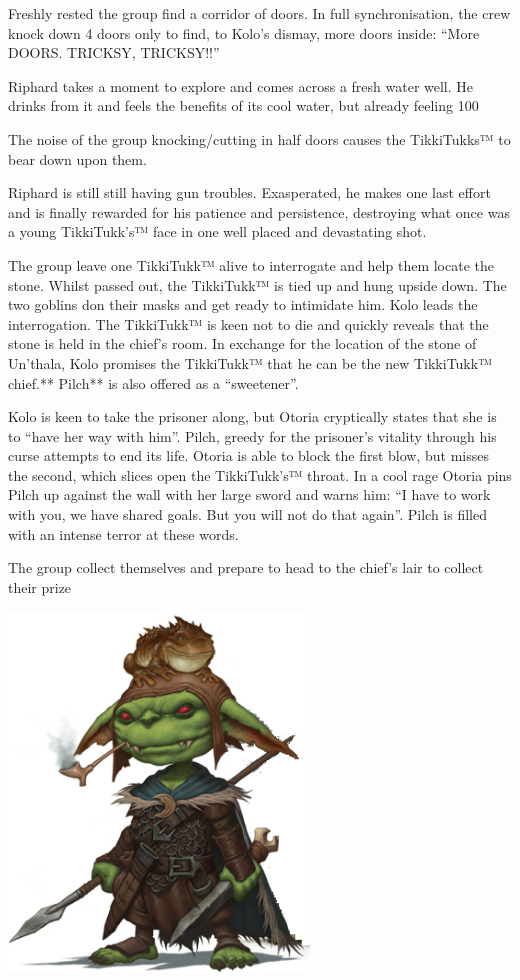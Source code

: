 Freshly rested the group find a corridor of doors. In full synchronisation, the crew knock down 4 doors only to find, to Kolo’s dismay, more doors inside: “More DOORS. TRICKSY, TRICKSY!!”

Riphard takes a moment to explore and comes across a fresh water well. He drinks from it and feels the benefits of its cool water, but already feeling 100%

The noise of the group knocking/cutting in half doors causes the TikkiTukks™ to bear down upon them.

Riphard is still still having gun troubles. Exasperated, he makes one last effort and is finally rewarded for his patience and persistence, destroying what once was a young TikkiTukk's™ face in one well placed and devastating shot.

The group leave one TikkiTukk™ alive to interrogate and help them locate the stone. Whilst passed out, the TikkiTukk™ is tied up and hung upside down. The two goblins don their masks and get ready to intimidate him. Kolo leads the interrogation. The TikkiTukk™ is keen not to die and quickly reveals that the stone is held in the chief’s room. In exchange for the location of the stone of Un'thala, Kolo promises the TikkiTukk™ that he can be the new TikkiTukk™ chief.** Pilch** is also offered as a “sweetener”.

Kolo is keen to take the prisoner along, but Otoria cryptically states that she is to “have her way with him”. Pilch, greedy for the prisoner’s vitality through his curse attempts to end its life. Otoria is able to block the first blow, but misses the second, which slices open the TikkiTukk’s™ throat. In a cool rage Otoria pins Pilch up against the wall with her large sword and warns him: “I have to work with you, we have shared goals. But you will not do that again”. Pilch is filled with an intense terror at these words.

The group collect themselves and prepare to head to the chief’s lair to collect their prize

\begin{center}
\includegraphics[width=80mm]{./img/kolo2.png}
\begin{figure}[h]
\end{figure}
\end{center}

\clearpage

